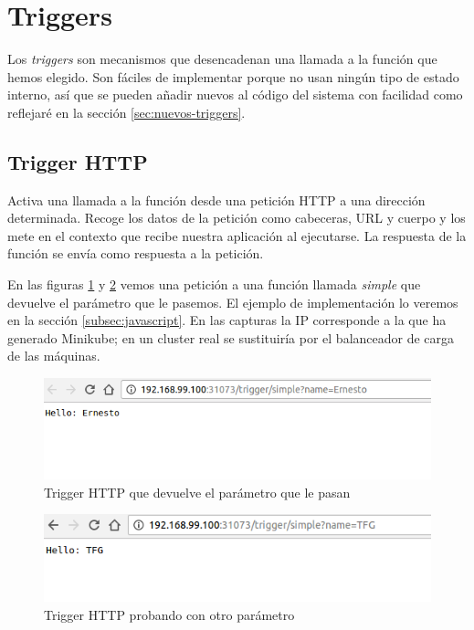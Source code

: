 \section{Triggers}

Los \emph{triggers} son mecanismos que desencadenan una llamada a la función que hemos elegido. Son fáciles de implementar porque no usan ningún tipo de estado interno, así que se pueden añadir nuevos al código del sistema con facilidad como reflejaré en la sección \ref{sec:nuevos-triggers}.

\subsection{Trigger HTTP}
\label{sec:trigger-http}

Activa una llamada a la función desde una petición HTTP a una dirección determinada. Recoge los datos de la petición como cabeceras, URL y cuerpo y los mete en el contexto que recibe nuestra aplicación al ejecutarse. La respuesta de la función se envía como respuesta a la petición.

En las figuras \ref{fig:trigger-http} y \ref{fig:trigger-http2} vemos una petición a una función llamada \emph{simple} que devuelve el parámetro que le pasemos. El ejemplo de implementación lo veremos en la sección \ref{subsec:javascript}. En las capturas la IP corresponde a la que ha generado Minikube; en un cluster real se sustituiría por el balanceador de carga de las máquinas.

\begin{figure}[H]
    \centering
    \includegraphics[width=\textwidth]{../images/output/ernesto.png}
    \caption{Trigger HTTP que devuelve el parámetro que le pasan}
    \label{fig:trigger-http}
\end{figure}

\begin{figure}[H]
    \centering
    \includegraphics[width=\textwidth]{../images/output/tfg.png}
    \caption{Trigger HTTP probando con otro parámetro}
    \label{fig:trigger-http2}
\end{figure}


